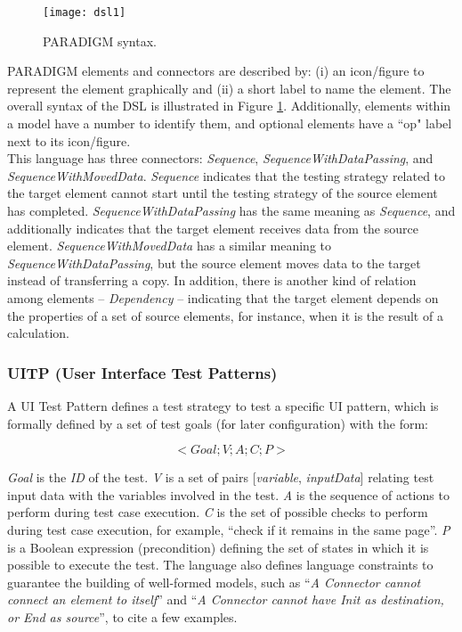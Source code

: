 \begin{figure}[!htb]
\centering
\texttt{[image: dsl1]}
\caption{PARADIGM syntax.}
\label{fig:dsl1}
\end{figure}

PARADIGM elements and connectors are described by: (i) an icon/figure to represent the element graphically and (ii) a short label to name the element. The overall syntax of the DSL is illustrated in Figure \ref{fig:dsl1}. Additionally, elements within a model have a number to identify them, and optional elements have a ``op" label next to its icon/figure.\\

This language has three connectors: \textit{Sequence}, \textit{SequenceWithDataPassing}, and \textit{SequenceWithMovedData}. \textit{Sequence} indicates that the testing strategy related to the target element cannot start until the testing strategy of the source element has completed. \textit{SequenceWithDataPassing} has the same meaning as \textit{Sequence}, and additionally indicates that the target element receives data from the source element. \textit{SequenceWithMovedData} has a similar meaning to \textit{SequenceWithDataPassing}, but the source element moves data to the target instead of transferring a copy. In addition, there is another kind of relation among elements -- \textit{Dependency} -- indicating that the target element depends on the properties of a set of source elements, for instance, when it is the result of a calculation. \\

\subsubsection{UITP (User Interface Test Patterns)}

A UI Test Pattern defines a test strategy to test a specific UI pattern, which is formally defined by a set of test goals (for later configuration)\cite{moreira2013pattern} with the form:

\begin{equation}< Goal; V; A; C; P >\end{equation}\label{eq:ui_}

\textit{Goal} is the \textit{ID} of the test. \textit{V} is a set of pairs { [\textit{variable}, \textit{inputData}] } relating test input data with the variables involved in the test. \textit{A} is the sequence of actions to perform during test case execution. \textit{C} is the set of possible checks to perform during test case execution, for example, “check if it remains in the same page”. \textit{P} is a Boolean expression (precondition) defining the set of states in which it is possible to execute the test. The language also defines language constraints to guarantee the building of well-formed models, such as ``\textit{A Connector cannot connect an element to itself}'' and ``\textit{A Connector cannot have Init as destination, or End as source}'', to cite a few examples.\\

